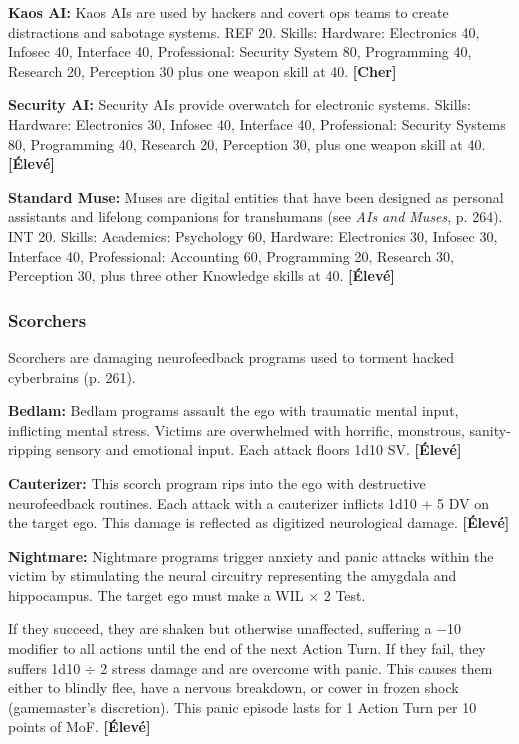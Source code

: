 {{\textbf{Kaos AI:} Kaos AIs are used by hackers and covert ops teams to create distractions and sabotage systems. REF 20. Skills: Hardware: Electronics 40, Infosec 40, Interface 40, Professional: Security System 80, Programming 40, Research 20, Perception 30 plus one weapon skill at 40. \textbf{[Cher]} 

\textbf{Security AI:} Security AIs provide overwatch for electronic systems. Skills: Hardware: Electronics 30, Infosec 40, Interface 40, Professional: Security Systems 80, Programming 40, Research 20, Perception 30, plus one weapon skill at 40. \textbf{[Élevé]} 

\textbf{Standard Muse:} Muses are digital entities that have been designed as personal assistants and lifelong companions for transhumans (see \emph{AIs and Muses}, p. 264). INT 20. Skills: Academics: Psychology 60, Hardware: Electronics 30, Infosec 30, Interface 40, Professional: Accounting 60, Programming 20, Research 30, Perception 30, plus three other Knowledge skills at 40. \textbf{[Élevé]} 

\subsubsection{Scorchers} 

Scorchers are damaging neurofeedback programs used to torment hacked cyberbrains (p. 261). 

\textbf{Bedlam:} Bedlam programs assault the ego with traumatic mental input, inflicting mental stress. Victims are overwhelmed with horrific, monstrous, sanity-ripping sensory and emotional input. Each attack floors 1d10 SV. \textbf{[Élevé]} 

\textbf{Cauterizer:} This scorch program rips into the ego with destructive neurofeedback routines. Each attack with a cauterizer inflicts 1d10 + 5 DV on the target ego. This damage is reflected as digitized neurological damage. \textbf{[Élevé]} 

\textbf{Nightmare:} Nightmare programs trigger anxiety and panic attacks within the victim by stimulating the neural circuitry representing the amygdala and hippocampus. The target ego must make a WIL $\times$ 2 Test. 

If they succeed, they are shaken but otherwise unaffected, suffering a $-$10 modifier to all actions until the end of the next Action Turn. If they fail, they suffers 1d10 $\div$ 2 stress damage and are overcome with panic. This causes them either to blindly flee, have a nervous breakdown, or cower in frozen shock (gamemaster’s discretion). This panic episode lasts for 1 Action Turn per 10 points of MoF. \textbf{[Élevé]} 

}}
